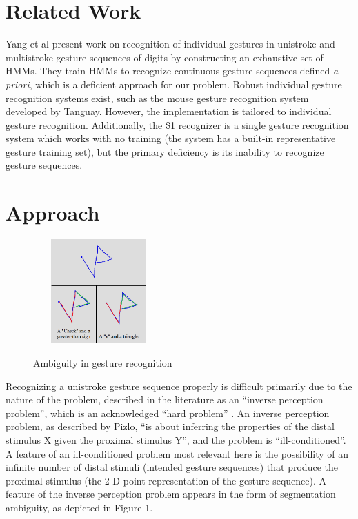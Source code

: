 \documentclass[twoside]{article}
\begin{document}
\begin{multicols}{2}
\section{Related Work}
Yang et al \cite{yang_gesture_1994} present work on recognition of individual
gestures in unistroke and multistroke gesture sequences of digits by
constructing an exhaustive set of HMMs. They train HMMs to recognize continuous
gesture sequences defined \textit{a priori}, which is a deficient approach for
our problem. Robust individual gesture recognition systems exist, such as the
mouse gesture recognition system developed by
Tanguay\cite{tanguay_jr_hidden_1995}. However, the implementation is tailored to
individual gesture recognition. Additionally, the \$1 recognizer
\cite{wobbrock2007gestures} is a single gesture recognition system which works
with no training (the system has a built-in representative gesture training
set), but the primary deficiency is its inability to recognize gesture
sequences.
\section{Approach}
\begin{figure}[H]
	\centering
	\includegraphics[height=4cm, width=5cm]{Images/Ambiguity1.png}
	\label{fig2}
	\caption{Ambiguity in gesture recognition}
\end{figure}

Recognizing a unistroke gesture sequence properly is difficult primarily due to
the nature of the problem, described in the literature as an ``inverse
perception problem'', which is an acknowledged ``hard problem''
\cite{pizlo_perception_2001}. An inverse perception problem, as
described by Pizlo, ``is about inferring the properties of the distal stimulus X
given the proximal stimulus Y'', and the problem is ``ill-conditioned''. A
feature of an ill-conditioned problem most relevant here is the possibility of
an infinite number of distal stimuli (intended gesture sequences) that produce
the proximal stimulus (the 2-D point representation of the gesture sequence). A feature of the
inverse perception problem appears in the form of segmentation ambiguity, as
depicted in Figure 1.


\end{multicols}
\end{document}
